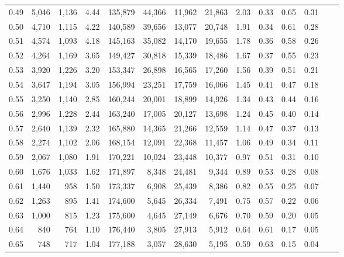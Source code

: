 \begin{tabular}{rrrrrrrrrrrrrr}
0.49 &  5,046 &  1,136 &    4.44 &  135,879 &   44,366 &  11,962 &  21,863 &  2.03 &  0.33 &  0.65 &      0.31 \\
0.50 &  4,710 &  1,115 &    4.22 &  140,589 &   39,656 &  13,077 &  20,748 &  1.91 &  0.34 &  0.61 &      0.28 \\
0.51 &  4,574 &  1,093 &    4.18 &  145,163 &   35,082 &  14,170 &  19,655 &  1.78 &  0.36 &  0.58 &      0.26 \\
0.52 &  4,264 &  1,169 &    3.65 &  149,427 &   30,818 &  15,339 &  18,486 &  1.67 &  0.37 &  0.55 &      0.23 \\
0.53 &  3,920 &  1,226 &    3.20 &  153,347 &   26,898 &  16,565 &  17,260 &  1.56 &  0.39 &  0.51 &      0.21 \\
0.54 &  3,647 &  1,194 &    3.05 &  156,994 &   23,251 &  17,759 &  16,066 &  1.45 &  0.41 &  0.47 &      0.18 \\
0.55 &  3,250 &  1,140 &    2.85 &  160,244 &   20,001 &  18,899 &  14,926 &  1.34 &  0.43 &  0.44 &      0.16 \\
0.56 &  2,996 &  1,228 &    2.44 &  163,240 &   17,005 &  20,127 &  13,698 &  1.24 &  0.45 &  0.40 &      0.14 \\
0.57 &  2,640 &  1,139 &    2.32 &  165,880 &   14,365 &  21,266 &  12,559 &  1.14 &  0.47 &  0.37 &      0.13 \\
0.58 &  2,274 &  1,102 &    2.06 &  168,154 &   12,091 &  22,368 &  11,457 &  1.06 &  0.49 &  0.34 &      0.11 \\
0.59 &  2,067 &  1,080 &    1.91 &  170,221 &   10,024 &  23,448 &  10,377 &  0.97 &  0.51 &  0.31 &      0.10 \\
0.60 &  1,676 &  1,033 &    1.62 &  171,897 &    8,348 &  24,481 &   9,344 &  0.89 &  0.53 &  0.28 &      0.08 \\
0.61 &  1,440 &    958 &    1.50 &  173,337 &    6,908 &  25,439 &   8,386 &  0.82 &  0.55 &  0.25 &      0.07 \\
0.62 &  1,263 &    895 &    1.41 &  174,600 &    5,645 &  26,334 &   7,491 &  0.75 &  0.57 &  0.22 &      0.06 \\
0.63 &  1,000 &    815 &    1.23 &  175,600 &    4,645 &  27,149 &   6,676 &  0.70 &  0.59 &  0.20 &      0.05 \\
0.64 &    840 &    764 &    1.10 &  176,440 &    3,805 &  27,913 &   5,912 &  0.64 &  0.61 &  0.17 &      0.05 \\
0.65 &    748 &    717 &    1.04 &  177,188 &    3,057 &  28,630 &   5,195 &  0.59 &  0.63 &  0.15 &      0.04 \\

\end{tabular}
